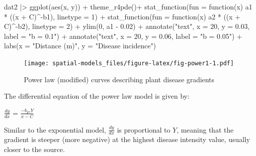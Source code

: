 \documentclass[
  letterpaper,
]{book}
\newenvironment{Shaded}{\begin{snugshade}}{\end{snugshade}}
\newcommand{\AttributeTok}[1]{\textcolor[rgb]{0.40,0.45,0.13}{#1}}
\newcommand{\ControlFlowTok}[1]{\textcolor[rgb]{0.00,0.23,0.31}{#1}}
\newcommand{\DecValTok}[1]{\textcolor[rgb]{0.68,0.00,0.00}{#1}}
\newcommand{\FloatTok}[1]{\textcolor[rgb]{0.68,0.00,0.00}{#1}}
\newcommand{\FunctionTok}[1]{\textcolor[rgb]{0.28,0.35,0.67}{#1}}
\newcommand{\NormalTok}[1]{\textcolor[rgb]{0.00,0.23,0.31}{#1}}
\newcommand{\SpecialCharTok}[1]{\textcolor[rgb]{0.37,0.37,0.37}{#1}}
\newcommand{\StringTok}[1]{\textcolor[rgb]{0.13,0.47,0.30}{#1}}
\begin{document}
\begin{Shaded}
\begin{Highlighting}[]
\NormalTok{dat2 }\SpecialCharTok{|\textgreater{}}
  \FunctionTok{ggplot}\NormalTok{(}\FunctionTok{aes}\NormalTok{(x, y)) }\SpecialCharTok{+}
  \FunctionTok{theme\_r4pde}\NormalTok{()}\SpecialCharTok{+}
  \FunctionTok{stat\_function}\NormalTok{(}\AttributeTok{fun =} \ControlFlowTok{function}\NormalTok{(x) a1 }\SpecialCharTok{*}\NormalTok{ ((x }\SpecialCharTok{+}\NormalTok{ C)}\SpecialCharTok{\^{}{-}}\NormalTok{b1), }\AttributeTok{linetype =} \DecValTok{1}\NormalTok{) }\SpecialCharTok{+}
  \FunctionTok{stat\_function}\NormalTok{(}\AttributeTok{fun =} \ControlFlowTok{function}\NormalTok{(x) a2 }\SpecialCharTok{*}\NormalTok{ ((x }\SpecialCharTok{+}\NormalTok{ C)}\SpecialCharTok{\^{}{-}}\NormalTok{b2), }\AttributeTok{linetype =} \DecValTok{2}\NormalTok{) }\SpecialCharTok{+}
  \FunctionTok{ylim}\NormalTok{(}\DecValTok{0}\NormalTok{, a1 }\SpecialCharTok{{-}} \FloatTok{0.02}\NormalTok{) }\SpecialCharTok{+}
  \FunctionTok{annotate}\NormalTok{(}\StringTok{"text"}\NormalTok{, }\AttributeTok{x =} \DecValTok{20}\NormalTok{, }\AttributeTok{y =} \FloatTok{0.03}\NormalTok{, }\AttributeTok{label =} \StringTok{"b = 0.1"}\NormalTok{) }\SpecialCharTok{+}
  \FunctionTok{annotate}\NormalTok{(}\StringTok{"text"}\NormalTok{, }\AttributeTok{x =} \DecValTok{20}\NormalTok{, }\AttributeTok{y =} \FloatTok{0.06}\NormalTok{, }\AttributeTok{label =} \StringTok{"b = 0.05"}\NormalTok{) }\SpecialCharTok{+}
  \FunctionTok{labs}\NormalTok{(}\AttributeTok{x =} \StringTok{"Distance (m)"}\NormalTok{, }\AttributeTok{y =} \StringTok{"Disease incidence"}\NormalTok{)}
\end{Highlighting}
\end{Shaded}

\begin{figure}

{\centering \texttt{[image: spatial-models\_files/figure-latex/fig-power1-1.pdf]}

}

\caption{\label{fig-power1}Power law (modified) curves describing plant
disease gradients}

\end{figure}

The differential equation of the power law model is given by:

\(\frac{dy}{dx}\) = \(\frac{-b_{P}.Y}{x - C}\)

Similar to the exponential model, \(\frac{dy}{dx}\) is proportional to
\(Y\), meaning that the gradient is steeper (more negative) at the
highest disease intensity value, usually closer to the source.
\end{document}
